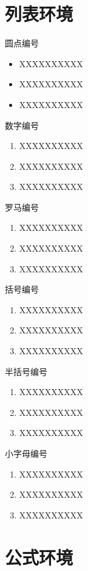 
\chapter{列表环境}

圆点编号
\begin{itemize}
 \item XXXXXXXXXX
 \item XXXXXXXXXX
 \item XXXXXXXXXX
\end{itemize}

数字编号
\begin{enumerate}
 \item XXXXXXXXXX
 \item XXXXXXXXXX
 \item XXXXXXXXXX
\end{enumerate}

罗马编号
\begin{enumerate}[label=(\roman*)]
 \item XXXXXXXXXX
 \item XXXXXXXXXX
 \item XXXXXXXXXX
\end{enumerate}

括号编号
\begin{enumerate}[label=(\arabic*)]
 \item XXXXXXXXXX
 \item XXXXXXXXXX
 \item XXXXXXXXXX
\end{enumerate}

半括号编号
\begin{enumerate}[label=\arabic*)]
 \item XXXXXXXXXX
 \item XXXXXXXXXX
 \item XXXXXXXXXX
\end{enumerate}

小字母编号
\begin{enumerate}[label=\alph*)]
 \item XXXXXXXXXX
 \item XXXXXXXXXX
 \item XXXXXXXXXX
\end{enumerate}


\chapter{公式环境}

